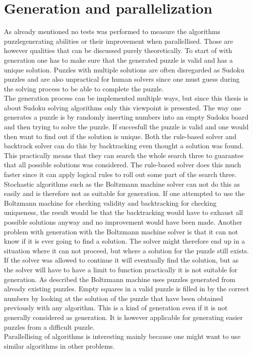 \documentclass[a4paper,11pt]{kth-mag}
\begin{document}
\section{Generation and parallelization}
\label{sec:generation}
As already mentioned no tests was performed to measure the algorithms puzzlegenerating abilities or their improvement when parallellised.
Those are however qualities that can be discussed purely theoretically.
To start of with generation one has to make sure that the generated puzzle is valid and has a unique solution.
Puzzles with multiple solutions are often disregarded as Sudoku puzzles and are also unpractical for human solvers since one must guess during the solving process to be able to complete the puzzle.
\\
The generation process can be implemented multiple ways, but since this thesis is about Sudoku solving algorithms only this viewpoint is presented.
The way one generates a puzzle is by randomly inserting numbers into an empty Sudoku board and then trying to solve the puzzle. If succesfull the puzzle is valid and one would then want to find out if the solution is unique. 
Both the rule-based solver and backtrack solver can do this by backtracking even thought a solution was found. This practically means that they can search the whole search three to guarantee that all possible solutions was considered.
The rule-based solver does this much faster since it can apply logical rules to roll out some part of the search three.
Stochastic algorithms such as the Boltzmann machine solver can not do this as easily and is therefore not as suitable for generation.
If one attempted to use the Boltzmann machine for checking validity and backtracking for checking uniqueness, the result would be that the backtracking would have to exhaust all possible solutions anyway and no improvement would have been made.
Another problem with generation with the Boltzmann machine solver is that it can not know if it is ever going to find a solution.
The solver might therefore end up in a situation where it can not proceed, but where a solution for the puzzle still exists.
If the solver was allowed to continue it will eventually find the solution, but as the solver will have to have a limit to function practically it is not suitable for generation.
As described the Boltzmann machine uses puzzles generated from already existing puzzles.
Empty squares in a valid puzzle is filled in by the correct numbers by looking at the solution of the puzzle that have been obtained previously with any algorithm.
This is a kind of generation even if it is not generally considered as generation.
It is however applicable for generating easier puzzles from a difficult puzzle.
\\
Parallellising of algorithms is interesting mainly because one might want to use similar algorithms in other problems. 
\end{document}
